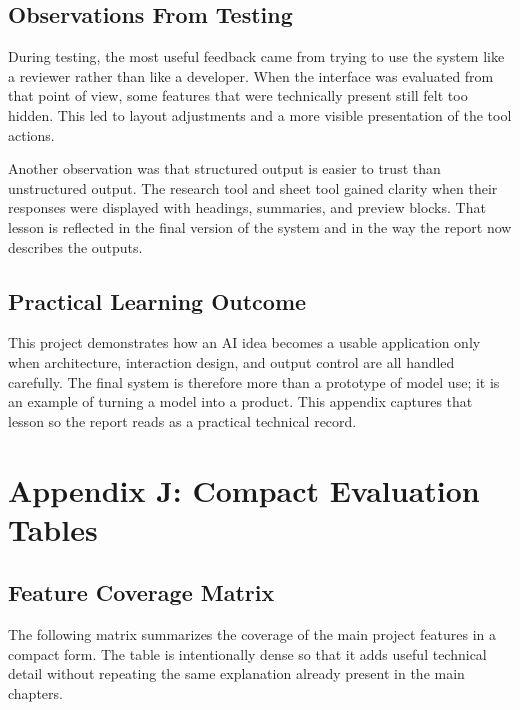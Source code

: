 \documentclass[11pt,oneside]{report}
\begin{document}
\section{Observations From Testing}
During testing, the most useful feedback came from trying to use the system like a reviewer rather than like a developer. When the interface was evaluated from that point of view, some features that were technically present still felt too hidden. This led to layout adjustments and a more visible presentation of the tool actions.

Another observation was that structured output is easier to trust than unstructured output. The research tool and sheet tool gained clarity when their responses were displayed with headings, summaries, and preview blocks. That lesson is reflected in the final version of the system and in the way the report now describes the outputs.

\section{Practical Learning Outcome}
This project demonstrates how an AI idea becomes a usable application only when architecture, interaction design, and output control are all handled carefully. The final system is therefore more than a prototype of model use; it is an example of turning a model into a product. This appendix captures that lesson so the report reads as a practical technical record.

\chapter{Appendix J: Compact Evaluation Tables}
\section{Feature Coverage Matrix}
The following matrix summarizes the coverage of the main project features in a compact form. The table is intentionally dense so that it adds useful technical detail without repeating the same explanation already present in the main chapters.
\end{document}
